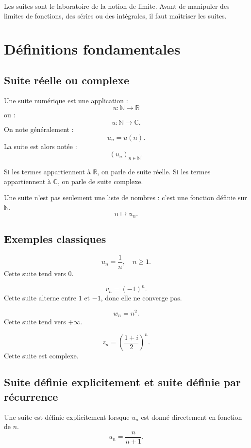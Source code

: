 \documentclass[11pt,a4paper]{article}
\newcommand{\N}{\mathbb N}
\newcommand{\R}{\mathbb R}
\newcommand{\C}{\mathbb C}
\begin{document}
\begin{retenirbox}
Les suites sont le laboratoire de la notion de limite.  
Avant de manipuler des limites de fonctions, des séries ou des intégrales, il faut maîtriser les suites.
\end{retenirbox}

\section{Définitions fondamentales}

\subsection{Suite réelle ou complexe}

\begin{definitionbox}
Une suite numérique est une application :
\[
u:\N\to\R
\]
ou :
\[
u:\N\to\C.
\]
On note généralement :
\[
u_n=u(n).
\]
La suite est alors notée :
\[
(u_n)_{n\in\N}.
\]
\end{definitionbox}

Si les termes appartiennent à \(\R\), on parle de suite réelle.  
Si les termes appartiennent à \(\C\), on parle de suite complexe.

\begin{retenirbox}
Une suite n'est pas seulement une liste de nombres : c'est une fonction définie sur \(\N\).
\[
n\longmapsto u_n.
\]
\end{retenirbox}

\subsection{Exemples classiques}

\[
u_n=\frac1n,\quad n\geq1.
\]
Cette suite tend vers \(0\).

\[
v_n=(-1)^n.
\]
Cette suite alterne entre \(1\) et \(-1\), donc elle ne converge pas.

\[
w_n=n^2.
\]
Cette suite tend vers \(+\infty\).

\[
z_n=\left(\frac{1+i}{2}\right)^n.
\]
Cette suite est complexe.

\subsection{Suite définie explicitement et suite définie par récurrence}

\begin{definitionbox}
Une suite est définie explicitement lorsque \(u_n\) est donné directement en fonction de \(n\).
\[
u_n=\frac{n}{n+1}.
\]
\end{definitionbox}
\end{document}
